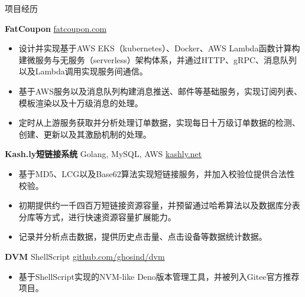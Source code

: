 \documentclass{resume} %
\begin{document}
\begin{rSection}{项目经历}
  \vspace{-1.25em}
  
  \item \textbf{FatCoupon} {} \hfill \href{www.fatcoupon.com}{fatcoupon.com}
  \begin{itemize}
    \itemsep -3pt {}
    \item 设计并实现基于AWS EKS（kubernetes）、Docker、AWS Lambda函数计算构建微服务与无服务（serverless）架构体系，并通过HTTP、gRPC、消息队列以及Lambda调用实现服务间通信。
    \item 基于AWS服务以及消息队列构建消息推送、邮件等基础服务，实现订阅列表、模板渲染以及十万级消息的处理。
    \item 定时从上游服务获取并分析处理订单数据，实现每日十万级订单数据的检测、创建、更新以及其激励机制的处理。
  \end{itemize}
  
  \item \textbf{Kash.ly短链接系统} {Golang, MySQL, AWS} \hfill \href{kashly.net}{kashly.net}
  \begin{itemize}
    \itemsep -3pt {}
    \item 基于MD5、LCG以及Base62算法实现短链接服务，并加入校验位提供合法性校验。
    \item 初期提供约一千四百万短链接资源容量，并预留通过哈希算法以及数据库分表分库等方式，进行快速资源容量扩展能力。
    \item 记录并分析点击数据，提供历史点击量、点击设备等数据统计数据。
  \end{itemize}
  
  \item \textbf{DVM} {ShellScript} \hfill \href{github.com/ghosind/dvm}{github.com/ghosind/dvm}
  \begin{itemize}
    \itemsep -3pt {}
    \item 基于ShellScript实现的NVM-like Deno版本管理工具，并被列入Gitee官方推荐项目。
  \end{itemize}
  
\end{rSection}
  
\end{document}
